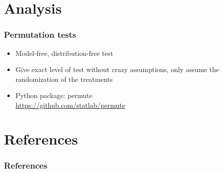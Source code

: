 \documentclass{beamer}
\begin{document}
\section{Analysis}
\frame
{
 \frametitle{Permutation tests}
 \begin{itemize}
 \item Model-free, distribution-free test
 \item Give exact level of test without crazy assumptions, only assume the randomization of the treatments
 \item{Python package: permute \\
 \url{https://github.com/statlab/permute}
 }
 \end{itemize}

}

\section{References}
\begin{frame}
\frametitle{References}


\itemize
\end{frame}
\end{document}
